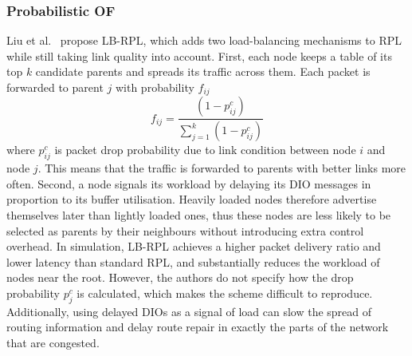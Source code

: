 \subsubsection{Probabilistic OF}
Liu et al.~\cite{liuLoadBalancedRouting2013} propose LB-RPL, which adds two
load-balancing mechanisms to RPL while still taking link quality into
account. First, each node keeps a table of its top $k$ candidate
parents and spreads its traffic across them. Each packet is forwarded to parent
$j$ with probability $f_{ij}$
\begin{equation}
    f_{ij} = \frac{(1 - p^{c}_{ij})}{\sum_{j=1}^{k} (1 - p^{c}_{ij})}
\end{equation}
where $p^{c}_{ij}$ is packet drop probability due to link condition
between node $i$ and node $j$. This means that the traffic is
forwarded to parents with better links more often.
Second, a node signals its workload by delaying its DIO messages in
proportion to its buffer utilisation. Heavily loaded nodes therefore
advertise themselves later than lightly loaded ones, thus these nodes are less
likely to be selected as parents by their neighbours without introducing
extra control overhead. In simulation, LB-RPL achieves a higher
packet delivery ratio and lower latency than standard RPL, and
substantially reduces the workload of nodes near the root.
However, the authors do not specify
how the drop probability $p_{j}^{c}$ is calculated, which makes the
scheme difficult to reproduce. Additionally, using delayed DIOs as a signal
of load can slow the spread of routing information and delay route
repair in exactly the parts of the network that are congested.

